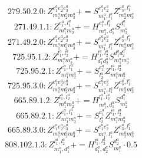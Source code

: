 \documentclass[letterpaper,10pt,fleqn,leqno,onecolumn]{article}
\begin{document}
\begin{equation} \;\;\;\;\;\;  279.50.2.0: Z^{e_{1}^{a}e_{2}^{a}e_{3}^{a}}_{m_{1}^{a}m_{2}^{a}m_{3}^{a}}+=S^{e_{1}^{a}e_{2}^{a}}_{m_{1}^{a},l_{1}^{a}}Z^{e_{3}^{a},l_{1}^{a}}_{m_{2}^{a}m_{3}^{a}} \end{equation}
\begin{equation} \;\;\;\;\;\;  271.49.1.1: Z^{e_{1}^{a},l_{1}^{a}}_{m_{1}^{a}m_{2}^{a}}+=H^{e_{1}^{a},l_{1}^{a}}_{m_{1}^{a},d_{1}^{a}}S^{d_{1}^{a}}_{m_{2}^{a}} \end{equation}
\begin{equation} \;\;\;\;\;\;  271.49.2.0: Z^{e_{1}^{a}e_{2}^{a}e_{3}^{a}}_{m_{1}^{a}m_{2}^{a}m_{3}^{a}}+=S^{e_{1}^{a}e_{2}^{a}}_{m_{1}^{a},l_{1}^{a}}Z^{e_{3}^{a},l_{1}^{a}}_{m_{2}^{a}m_{3}^{a}} \end{equation}
\begin{equation} \;\;\;\;\;\;  725.95.1.2: Z^{l_{1}^{a},l_{2}^{a}}_{m_{1}^{a}m_{2}^{a}}+=H^{l_{1}^{a},l_{2}^{a}}_{d_{1}^{a}d_{2}^{a}}S^{d_{1}^{a}d_{2}^{a}}_{m_{1}^{a}m_{2}^{a}} \end{equation}
\begin{equation} \;\;\;\;\;\;  725.95.2.1: Z^{e_{1}^{a},l_{1}^{a}}_{m_{1}^{a}m_{2}^{a}}+=S^{e_{1}^{a}}_{l_{2}^{a}}Z^{l_{1}^{a},l_{2}^{a}}_{m_{1}^{a}m_{2}^{a}} \end{equation}
\begin{equation} \;\;\;\;\;\;  725.95.3.0: Z^{e_{1}^{a}e_{2}^{a}e_{3}^{a}}_{m_{1}^{a}m_{2}^{a}m_{3}^{a}}+=S^{e_{1}^{a}e_{2}^{a}}_{m_{1}^{a},l_{1}^{a}}Z^{e_{3}^{a},l_{1}^{a}}_{m_{2}^{a}m_{3}^{a}} \end{equation}
\begin{equation} \;\;\;\;\;\;  665.89.1.2: Z^{l_{1}^{a},l_{2}^{a}}_{m_{1}^{a}m_{2}^{a}}+=H^{l_{1}^{a},l_{2}^{a}}_{m_{1}^{a},d_{1}^{a}}S^{d_{1}^{a}}_{m_{2}^{a}} \end{equation}
\begin{equation} \;\;\;\;\;\;  665.89.2.1: Z^{e_{1}^{a},l_{1}^{a}}_{m_{1}^{a}m_{2}^{a}}+=S^{e_{1}^{a}}_{l_{2}^{a}}Z^{l_{1}^{a},l_{2}^{a}}_{m_{1}^{a}m_{2}^{a}} \end{equation}
\begin{equation} \;\;\;\;\;\;  665.89.3.0: Z^{e_{1}^{a}e_{2}^{a}e_{3}^{a}}_{m_{1}^{a}m_{2}^{a}m_{3}^{a}}+=S^{e_{1}^{a}e_{2}^{a}}_{m_{1}^{a},l_{1}^{a}}Z^{e_{3}^{a},l_{1}^{a}}_{m_{2}^{a}m_{3}^{a}} \end{equation}
\begin{equation} \;\;\;\;\;\;  808.102.1.3: Z^{l_{1}^{a},l_{2}^{a}}_{m_{1}^{a},d_{1}^{a}}+=H^{l_{1}^{a},l_{2}^{a}}_{d_{1}^{a},d_{2}^{a}}S^{d_{2}^{a}}_{m_{1}^{a}}\cdot 0.5 \end{equation}
\end{document}
